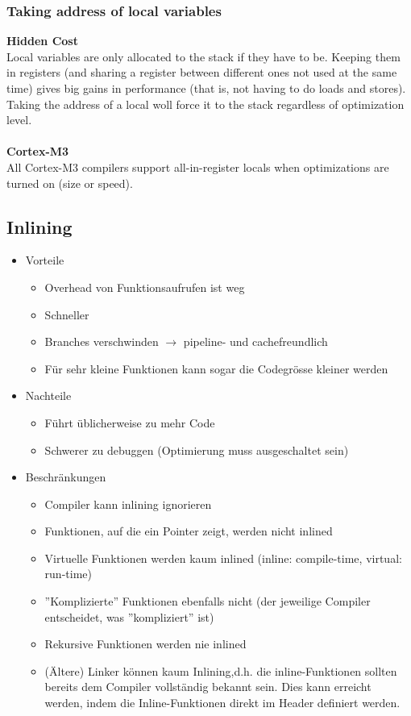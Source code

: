 \subsubsection{Taking address of local variables}
\textbf{Hidden Cost}\\
Local variables are only allocated to the stack if they have to be. Keeping them in registers (and sharing a register between different ones not used at the same time) gives big gains in performance (that is, not having to do loads and stores). Taking the address of a local woll force it to the stack regardless of optimization level.\\
\\
\textbf{Cortex-M3}\\
All Cortex-M3 compilers support all-in-register locals when optimizations are turned on (size or speed).

\subsection{Inlining}
\begin{itemize}
	\item Vorteile
		\begin{itemize}
			\item Overhead von Funktionsaufrufen ist weg
			\item Schneller
			\item Branches verschwinden $\rightarrow$ pipeline- und cachefreundlich
			\item Für sehr kleine Funktionen kann sogar die Codegrösse kleiner werden
		\end{itemize}
	\item Nachteile
		\begin{itemize}
			\item Führt üblicherweise zu mehr Code
			\item Schwerer zu debuggen (Optimierung muss ausgeschaltet sein)
		\end{itemize}
	\item Beschränkungen
		\begin{itemize}
			\item Compiler kann inlining ignorieren
			\item Funktionen, auf die ein Pointer zeigt, werden nicht inlined
			\item Virtuelle Funktionen werden kaum inlined (inline: compile-time, virtual: run-time)
			\item ''Komplizierte'' Funktionen ebenfalls nicht (der jeweilige Compiler entscheidet, was ''kompliziert'' ist)
			\item Rekursive Funktionen werden nie inlined
			\item (Ältere) Linker können kaum Inlining,d.h. die inline-Funktionen sollten bereits dem Compiler vollständig bekannt sein. Dies kann erreicht werden, indem die Inline-Funktionen direkt im Header definiert werden.
		\end{itemize}
\end{itemize}

